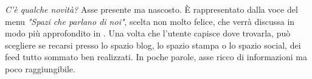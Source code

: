 \textit{C'è qualche novità?}\newline
Asse presente ma nascosto. \`E rappresentato dalla voce del menu \textit{"Spazi che parlano di noi"}, scelta non molto felice, che verrà discussa in modo più approfondito in . Una volta che l'utente capisce dove trovarla, può scegliere se recarsi presso lo spazio blog, lo spazio stampa o lo spazio social, dei feed tutto sommato ben realizzati. In poche parole, asse ricco di informazioni ma poco raggiungibile.